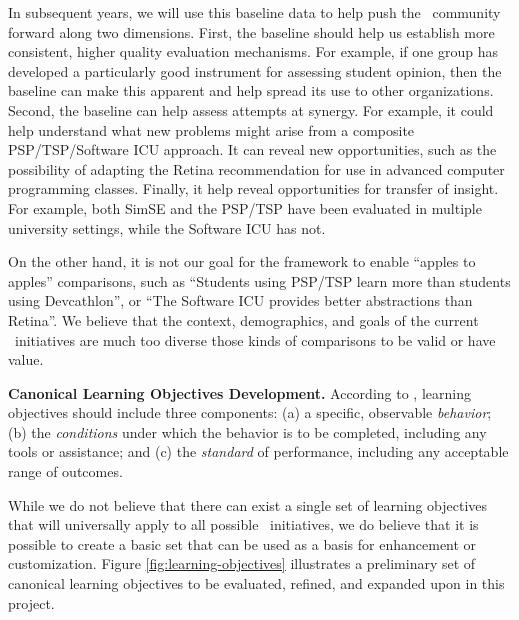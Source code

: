 In subsequent years, we will use this baseline data to help push the \eCT\
community forward along two dimensions. First, the baseline should help us
establish more consistent, higher quality evaluation mechanisms. For
example, if one group has developed a particularly good instrument for
assessing student opinion, then the baseline can make this apparent and
help spread its use to other organizations.  Second, the baseline can
help assess attempts at synergy.  For example, it could help understand what 
new problems might arise from a composite PSP/TSP/Software ICU approach. 
It can reveal new opportunities, such as the possibility of adapting the 
Retina recommendation for use in advanced computer programming classes. 
Finally, it help reveal opportunities for transfer of insight. For example, 
both SimSE and the PSP/TSP have been evaluated in multiple university settings, 
while the Software ICU has not. 

On the other hand, it is not our goal for the framework to enable ``apples
to apples'' comparisons, such as ``Students using PSP/TSP learn more than
students using Devcathlon'', or ``The Software ICU provides better abstractions
than Retina''.  We believe that the context, demographics, and goals of the
current \eCT\ initiatives are much too diverse those kinds of comparisons
to be valid or have value.

{\bf Canonical Learning Objectives Development.}  According to
\cite{Mager62}, learning objectives should include three components: (a) a
specific, observable {\em behavior}; (b) the {\em conditions} under which
the behavior is to be completed, including any tools or assistance; and (c)
the {\em standard} of performance, including any acceptable range of
outcomes.

While we do not believe that there can exist a single set of learning
objectives that will universally apply to all possible \eCT\ initiatives,
we do believe that it is possible to create a basic set that can be used as
a basis for enhancement or customization.  Figure
\ref{fig:learning-objectives} illustrates a preliminary set of canonical
learning objectives to be evaluated, refined, and expanded upon in this project. 

